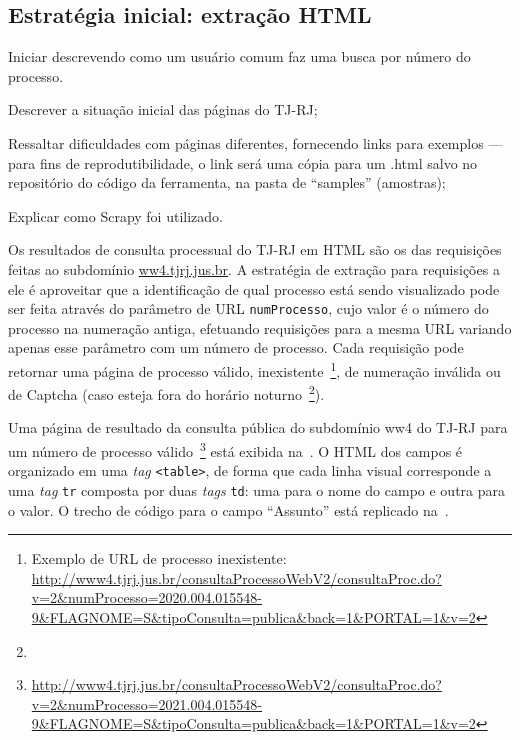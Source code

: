 \subsection{Estratégia inicial: extração HTML}

\begin{todolist}
    \item Iniciar descrevendo como um usuário comum faz uma busca por número do processo.
    \item Descrever a situação inicial das páginas do TJ-RJ;
    \item Ressaltar dificuldades com páginas diferentes, fornecendo links para
          exemplos --- para fins de reprodutibilidade, o link será uma cópia
          para um .html salvo no repositório do código da ferramenta, na pasta
          de ``samples'' (amostras);
    \item Explicar como Scrapy foi utilizado.
\end{todolist}


Os resultados de consulta processual do TJ-RJ em HTML são os das requisições
feitas ao subdomínio \url{ww4.tjrj.jus.br}. A estratégia de extração para
requisições a ele é aproveitar que a identificação de qual processo está sendo
visualizado pode ser feita através do parâmetro de URL \texttt{numProcesso},
cujo valor é o número do processo na numeração antiga, efetuando requisições
para a mesma URL variando apenas esse parâmetro com um número de processo. Cada
requisição pode retornar uma página de processo válido,
inexistente~\footnote{Exemplo de URL de processo inexistente:
\url{http://www4.tjrj.jus.br/consultaProcessoWebV2/consultaProc.do?v=2&numProcesso=2020.004.015548-9&FLAGNOME=S&tipoConsulta=publica&back=1&PORTAL=1&v=2}},
de numeração inválida ou de Captcha (caso esteja fora do horário
noturno~\footnote{}).

Uma página de resultado da consulta pública do subdomínio ww4 do
TJ-RJ para um número de processo
válido~\footnote{\url{http://www4.tjrj.jus.br/consultaProcessoWebV2/consultaProc.do?v=2&numProcesso=2021.004.015548-9&FLAGNOME=S&tipoConsulta=publica&back=1&PORTAL=1&v=2}}
está exibida na~. O HTML dos campos é organizado
em uma \textit{tag} \texttt{<table>}, de forma que cada linha visual
corresponde a uma \textit{tag} \texttt{tr} composta por duas \textit{tags}
\texttt{td}: uma para o nome do campo e outra para o valor. O trecho de código
para o campo ``Assunto'' está replicado na~.

